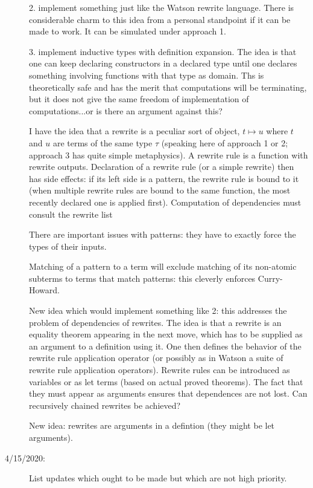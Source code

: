 \documentclass[12pt]{article}
\begin{document}
\begin{description}
2.  implement something just like the Watson rewrite language.  There is considerable charm to this idea from a personal standpoint if it can be made to work.  It can
be simulated under approach 1.

3.  implement inductive types with definition expansion.  The idea is that one can keep declaring constructors in a declared type until one declares something involving
functions with that type as domain.  Ths is theoretically safe and has the merit that computations will be terminating, but it does not give the same freedom of implementation
of computations...or is there an argument against this?

I have the idea that a rewrite is a peculiar sort of object, $t \mapsto u$ where $t$ and $u$ are terms of the same type $\tau$ (speaking here of approach 1 or 2;
approach 3  has quite simple metaphysics).  A rewrite rule is a function with rewrite outputs.  Declaration of a rewrite rule (or a simple rewrite) then has side effects:
if its left side is a pattern, the rewrite rule is bound to it (when multiple rewrite rules are bound to the same function, the most recently declared one is applied first).
Computation of dependencies must consult the rewrite list

There are important issues with patterns:  they have to exactly force the types of their inputs.

Matching of a pattern to a term will exclude matching of its non-atomic subterms to terms that match patterns:  this cleverly enforces Curry-Howard.

New idea which would implement something like 2:  this addresses the problem of dependencies of rewrites.  The idea is that a rewrite is an equality theorem appearing
in the next move, which has to be supplied as an argument to a definition using it.   One then defines the behavior of the rewrite rule application operator (or possibly
as in Watson a suite of rewrite rule application operators).  Rewrite rules can be introduced as variables or as let terms (based on actual proved theorems).  The fact
that they must appear as arguments ensures that dependences are not lost.  Can recursively chained rewrites be achieved?

New idea:  rewrites are arguments in a defintion (they might be let arguments).

\item[4/15/2020:]  List updates which ought to be made but which are not high priority.

\begin{enumerate}


\end{enumerate}
\end{description}
\end{document}
